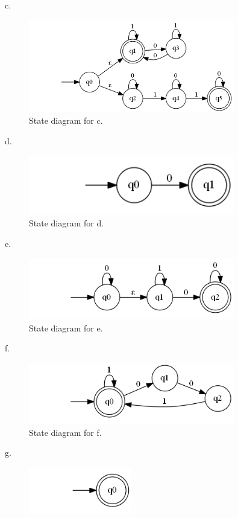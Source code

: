 \documentclass[10pt] {article}
\begin{document}
\begin{enumerate}
c.
\begin{figure}[H]
\includegraphics[width=0.8\textwidth]{c7.png}
\caption{State diagram for c.}
\label{8}
\end{figure} 
d.
\begin{figure}[H]
\includegraphics[width=0.8\textwidth]{d7.png}
\caption{State diagram for d.}
\label{8}
\end{figure} 
e.
\begin{figure}[H]
\includegraphics[width=0.8\textwidth]{e7.png}
\caption{State diagram for e.}
\label{8}
\end{figure} 
f.
\begin{figure}[H] 
\includegraphics[width=0.8\textwidth]{f7.png}
\caption{State diagram for f.}
\label{8}
\end{figure} 
g.
\begin{figure}[H]
\includegraphics[width=0.4\textwidth]{g7.png}

\end{figure}
\end{enumerate}
\end{document}
